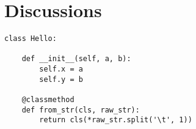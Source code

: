 \chapter{Discussions}
\label{c:discussion}


\begin{lstlisting}
class Hello:

    def __init__(self, a, b):
        self.x = a
        self.y = b

    @classmethod
    def from_str(cls, raw_str):
        return cls(*raw_str.split('\t', 1))
\end{lstlisting}
